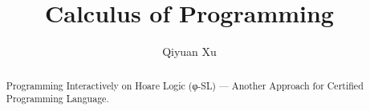 \documentclass{llncs}
\begin{document}
\title{Calculus of Programming}
\author{Qiyuan Xu}

\maketitle

\begin{abstract}
Programming Interactively on Hoare Logic (φ-SL)
          --- Another Approach for Certified Programming Language.
\end{abstract}







\end{document}
